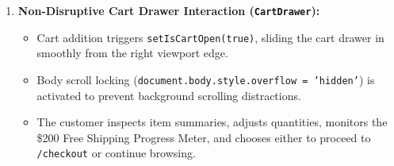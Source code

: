 \documentclass[12pt,a4paper,oneside]{report}
\begin{document}
\begin{enumerate}[leftmargin=1.2cm]
\begin{itemize}[nosep]
    \end{itemize}
    \item \textbf{Non-Disruptive Cart Drawer Interaction (\texttt{CartDrawer}):}
    \begin{itemize}[nosep]
        \item Cart addition triggers \texttt{setIsCartOpen(true)}, sliding the cart drawer in smoothly from the right viewport edge.
        \item Body scroll locking (\texttt{document.body.style.overflow = 'hidden'}) is activated to prevent background scrolling distractions.
        \item The customer inspects item summaries, adjusts quantities, monitors the \$200 Free Shipping Progress Meter, and chooses either to proceed to \texttt{/checkout} or continue browsing.
    \end{itemize}
\end{enumerate}
\end{document}
